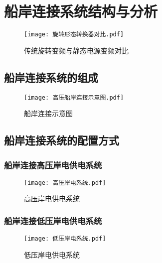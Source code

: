 \chapter{船岸连接系统结构与分析}

\zhlipsum[2]

\begin{figure}[!htp]
	\centering
	\texttt{[image: 旋转形态转换器对比.pdf]}
	\caption{传统旋转变频与静态电源变频对比}
	\label{fig:传统旋转变频与静态电源变频对比}
\end{figure}



\section{船岸连接系统的组成}

\zhlipsum[3]

\begin{figure}[!htp]
	\centering
	\texttt{[image: 高压船岸连接示意图.pdf]}
	\caption{船岸连接示意图}
	\label{fig:船岸连接示意图}
\end{figure}


\section{船岸连接系统的配置方式}

\subsection{船岸连接高压岸电供电系统}

\zhlipsum[1]

\begin{figure}[!htp]
	\centering
	\texttt{[image: 高压岸电系统.pdf]}
	\caption{高压岸电供电系统}
	\label{fig:高压岸电供电系统}
\end{figure}



\subsection{船岸连接低压岸电供电系统}


\zhlipsum[2]

\begin{figure}[!htp]
	\centering
	\texttt{[image: 低压岸电系统.pdf]}
	\caption{低压岸电供电系统}
	\label{fig:低压岸电供电系统}
\end{figure}



